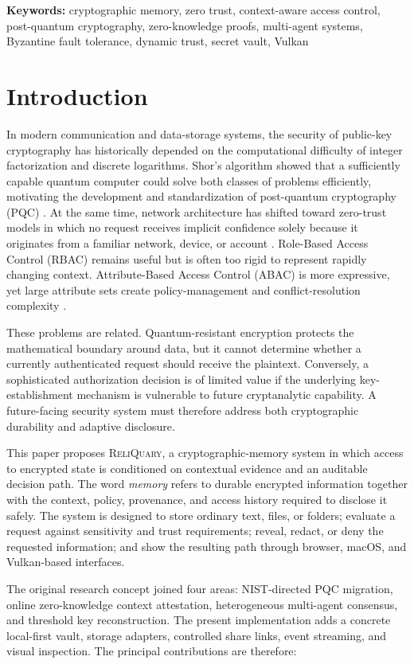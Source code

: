\documentclass[10pt]{article}
\newcommand{\system}{\textsc{ReliQuary}}
\let\cite\citep
\begin{document}
\textbf{Keywords:} cryptographic memory, zero trust, context-aware access control, post-quantum cryptography, zero-knowledge proofs, multi-agent systems, Byzantine fault tolerance, dynamic trust, secret vault, Vulkan

\section*{Introduction}

In modern communication and data-storage systems, the security of public-key cryptography has historically depended on the computational difficulty of integer factorization and discrete logarithms. Shor's algorithm showed that a sufficiently capable quantum computer could solve both classes of problems efficiently, motivating the development and standardization of post-quantum cryptography (PQC) \cite{shor1994,fips204,fips203}. At the same time, network architecture has shifted toward zero-trust models in which no request receives implicit confidence solely because it originates from a familiar network, device, or account \cite{nistzt}. Role-Based Access Control (RBAC) remains useful but is often too rigid to represent rapidly changing context. Attribute-Based Access Control (ABAC) is more expressive, yet large attribute sets create policy-management and conflict-resolution complexity \cite{rbac2000,abac2014,ucon}.

These problems are related. Quantum-resistant encryption protects the mathematical boundary around data, but it cannot determine whether a currently authenticated request should receive the plaintext. Conversely, a sophisticated authorization decision is of limited value if the underlying key-establishment mechanism is vulnerable to future cryptanalytic capability. A future-facing security system must therefore address both cryptographic durability and adaptive disclosure.

This paper proposes \system, a cryptographic-memory system in which access to encrypted state is conditioned on contextual evidence and an auditable decision path. The word \emph{memory} refers to durable encrypted information together with the context, policy, provenance, and access history required to disclose it safely. The system is designed to store ordinary text, files, or folders; evaluate a request against sensitivity and trust requirements; reveal, redact, or deny the requested information; and show the resulting path through browser, macOS, and Vulkan-based interfaces.

The original research concept joined four areas: NIST-directed PQC migration, online zero-knowledge context attestation, heterogeneous multi-agent consensus, and threshold key reconstruction. The present implementation adds a concrete local-first vault, storage adapters, controlled share links, event streaming, and visual inspection. The principal contributions are therefore:
\end{document}
